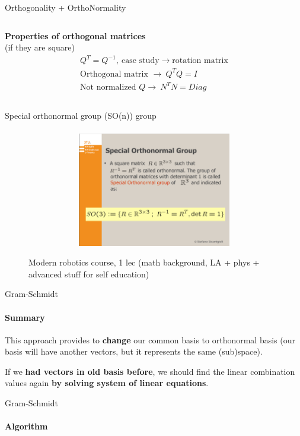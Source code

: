 \documentclass[aspectratio=169]{beamer}
\begin{document}
\begin{frame}[t]{Orthogonality + OrthoNormality}
\begin{columns}[T,onlytextwidth]
\begin{column}{0.49\textwidth}
            \centering \textbf{Properties of orthogonal matrices} \\ {\centering (if they are square)}
            \begin{align*}
                Q^T=Q^{-1},\ \text{case study} \rightarrow \text{rotation matrix} \\
                \text{Orthogonal matrix }\rightarrow \ Q^TQ = I \\
                \text{Not normalized } Q \rightarrow \ N^TN = Diag
            \end{align*}
        \end{column}
    \end{columns}
\end{frame}

\begin{frame}[t]{Special orthonormal group (SO(n)) group}
    \framesubtitle{}
    \begin{figure}[H]
        \href{https://disk.yandex.ru/i/XD6o-ZIGS4yLvA}{\centering\includegraphics[height=5cm,width=1\textwidth,keepaspectratio]{course_modern.png}}
        \caption*{Modern robotics course, 1 lec (math background, LA + phys + advanced stuff for self education)}
        \label{fig:course_modern.png}
    \end{figure}
\end{frame}

\begin{frame}[t]{Gram-Schmidt}
    \framesubtitle{Summary}
    \Large
    This approach provides to \textbf{change} our \alert{common basis} to \alert{orthonormal basis} (our basis will have another vectors, but it represents the same (sub)space).

    If we \textbf{had vectors in old basis before}, we should find the linear combination values again \textbf{by solving system of linear equations}.

\end{frame}

\begin{frame}[t]{Gram-Schmidt}
    \framesubtitle{Algorithm}
    \vspace{-0.8cm}
    \centering 
\end{frame}
\end{document}
